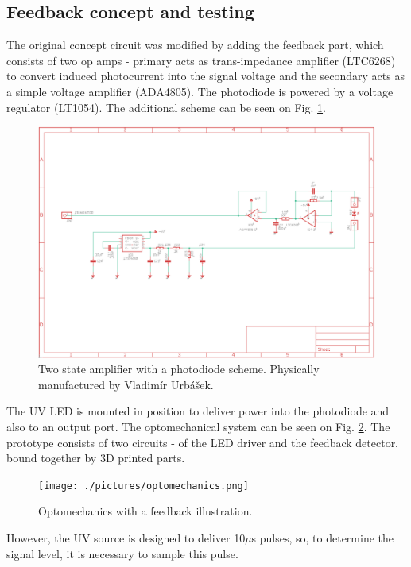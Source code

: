 \subsection{Feedback concept and testing}

The original concept circuit was modified by adding the feedback part, which consists of two op amps - primary acts as trans-impedance amplifier (LTC6268) to convert induced photocurrent into the signal voltage and the secondary acts as a simple voltage amplifier (ADA4805). The photodiode is powered by a voltage regulator (LT1054). The additional scheme can be seen on Fig. \ref{Amplifier}.
   
\begin{figure}[H]
 \centering
 \includegraphics[scale=0.45]{./pictures/FeedBackCirc.png}
 \caption{Two state amplifier with a photodiode scheme. Physically manufactured by Vladimír Urbášek.}
 \label{Amplifier}
\end{figure}

The UV LED is mounted in position to deliver power into the photodiode and also to an output port. The optomechanical system can be seen on Fig. \ref{Optomechanics}. The prototype consists of two circuits - of the LED driver and the feedback detector, bound together by 3D printed parts.

\begin{figure}[H]
 \centering
 \texttt{[image: ./pictures/optomechanics.png]}
 \caption{Optomechanics with a feedback illustration.}
 \label{Optomechanics}
\end{figure}


However, the UV source is designed to deliver 10$\mu$s pulses, so, to determine the signal level, it is necessary to sample this pulse. 

